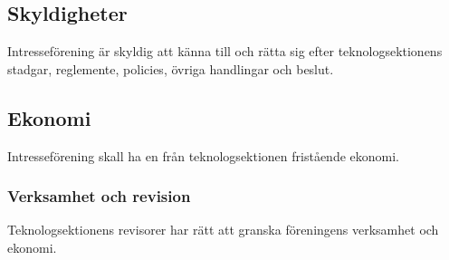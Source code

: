 \subsection{Skyldigheter}
Intresseförening är skyldig att känna till och rätta sig efter teknologsektionens stadgar, reglemente, policies, övriga handlingar och beslut.

\subsection{Ekonomi}
Intresseförening skall ha en från teknologsektionen fristående ekonomi.

\subsubsection{Verksamhet och revision}
Teknologsektionens revisorer har rätt att granska föreningens verksamhet och ekonomi.